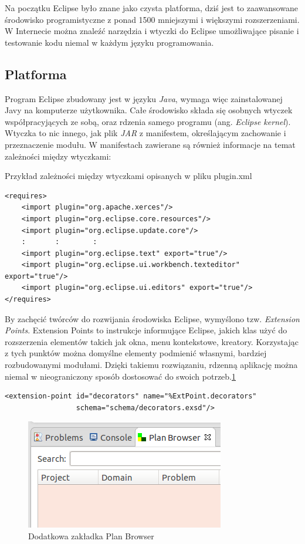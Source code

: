 Na początku Eclipse było znane jako czysta platforma, dziś jest to zaawansowane środowisko programistyczne z ponad 1500 mniejszymi i większymi rozszerzeniami. W Internecie można znaleźć narzędzia i wtyczki do Eclipse umożliwające pisanie i testowanie kodu niemal w każdym języku programowania.

\subsection{Platforma}
\label{subsec:platforma}
Program Eclipse zbudowany jest w języku \emph{Java}, wymaga więc zainstalowanej Javy na komputerze użytkownika.  Całe środowisko składa się osobnych wtyczek współpracyjących ze sobą, oraz rdzenia samego programu (ang. \emph{Eclipse kernel}). Wtyczka to nic innego, jak plik \emph{JAR} z manifestem, określającym zachowanie i przeznaczenie modułu. W manifestach zawierane są również informacje na temat zależności między wtyczkami:

Przykład zależności między wtyczkami opisanych w pliku plugin.xml
\begin{verbatim}
<requires>
	<import plugin="org.apache.xerces"/>
	<import plugin="org.eclipse.core.resources"/>
	<import plugin="org.eclipse.update.core"/>
	:       :        :
	<import plugin="org.eclipse.text" export="true"/>
	<import plugin="org.eclipse.ui.workbench.texteditor" export="true"/>
	<import plugin="org.eclipse.ui.editors" export="true"/>
</requires>
\end{verbatim}

By zachęcić twórców do rozwijania środowiska Eclipse, wymyślono tzw. \emph{Extension Points}. Extension Points to instrukcje informujące Eclipse, jakich klas użyć do rozszerzenia elementów takich jak okna, menu kontekstowe, kreatory. Korzystając z tych punktów można domyślne elementy podmienić własnymi, bardziej rozbudowanymi modułami. Dzięki takiemu rozwiązaniu, rdzenną aplikację można niemal w nieograniczony sposób dostosować do swoich potrzeb.\ref{ana_structure}

\begin{verbatim}
<extension-point id="decorators" name="%ExtPoint.decorators"
                 schema="schema/decorators.exsd"/>
\end{verbatim}

\begin{figure}[h]
  \centering
    \includegraphics{img/custom-window.png}
    \caption{Dodatkowa zakładka Plan Browser}
    \label{ana_structure}
\end{figure}

